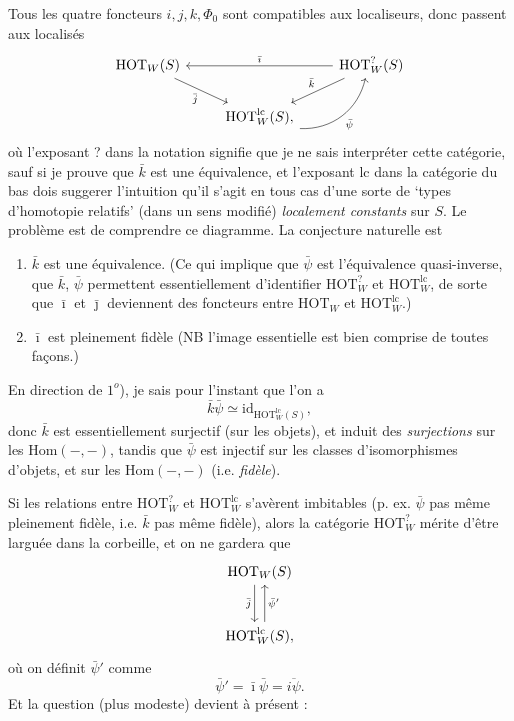 \documentclass[11pt]{article}
\newcommand{\printedpage}[1]{\marginpar{\footnotesize p.~#1}}
\newcommand{\msp}[1]{\marginpar{\footnotesize [#1]}}
\begin{document}
\msp{page 37}
Tous les quatre foncteurs $i, j, k, \Phi_0$ sont compatibles aux localiseurs, donc passent aux localisés
\printedpage{22}
\[
\begin{tikzcd}
\mathrm{HOT}_W(S) \arrow[dr, "\bar{j}"'] & & \mathrm{HOT}^{?}_W(S) \arrow[ll, "\bar{\imath}"'] \arrow[dl, "\bar{k}"'] \\
& \mathrm{HOT}^{\mathrm{lc}}_W(S), \arrow[ur, bend right=40, "\bar{\psi}"'] &
\end{tikzcd}
\]
où l'exposant ? dans la notation signifie que je ne sais interpréter cette catégorie, sauf si je prouve que $\bar{k}$ est une équivalence, et l'exposant lc dans la catégorie du bas dois suggerer l'intuition qu'il s'agit en tous cas d'une sorte de `types d'homotopie relatifs' (dans un sens modifié) \textit{localement constants} sur $S$. Le problème est de comprendre ce diagramme. La conjecture naturelle est %

\begin{enumerate}[leftmargin=*]
\item[$1^o$)] $\bar{k}$ est une équivalence. (Ce qui implique que $\bar{\psi}$ est l'équivalence quasi-inverse, que $\bar{k}$, $\bar{\psi}$ permettent essentiellement d'identifier $\mathrm{HOT}^{?}_W$ et $\mathrm{HOT}^{\mathrm{lc}}_W$, de sorte que $\bar{\imath}$ et $\bar{\jmath}$ deviennent des foncteurs entre $\mathrm{HOT}_W$ et $\mathrm{HOT}^{\mathrm{lc}}_W$.)

\item[$2^o$)] $\bar{\imath}$ est pleinement fidèle (NB l'image essentielle est bien comprise de toutes façons.)
\end{enumerate}

\msp{page 38}
En direction de $1^o$), je sais pour l'instant que l'on a
\[
\bar{k}\bar{\psi} \simeq \mathrm{id}_{\mathrm{HOT}^{\mathrm{lc}}_W(S)},
\]
donc $\bar{k}$ est essentiellement surjectif (sur les objets), et induit des \textit{surjections} sur les $\mathrm{Hom}(-,-)$, tandis que $\bar{\psi}$ est injectif sur les classes d'isomorphismes d'objets, et sur les $\mathrm{Hom}(-,-)$ (i.e. \textit{fidèle}).

Si les relations entre $\mathrm{HOT}^{?}_W$ et $\mathrm{HOT}^{\mathrm{lc}}_W$ s'avèrent imbitables (p. ex. $\bar{\psi}$ pas même pleinement fidèle, i.e. $\bar{k}$ pas même fidèle), alors la catégorie $\mathrm{HOT}^{?}_W$ mérite d'être larguée dans la corbeille, et on ne gardera que
\[
\begin{tikzcd}[row sep=large]
\mathrm{HOT}_W(S) \arrow[d, shift right=1.5, "\bar{j}"'] \\
\mathrm{HOT}^{\mathrm{lc}}_W(S), \arrow[u, shift right=1.5, "\bar{\psi}'"']
\end{tikzcd}
\]
où on définit $\bar{\psi}'$ comme
\[
\bar{\psi}' = \bar{\imath}\bar{\psi} = \overline{i\psi}.
\]
Et la question (plus modeste) devient à présent :
\end{document}
